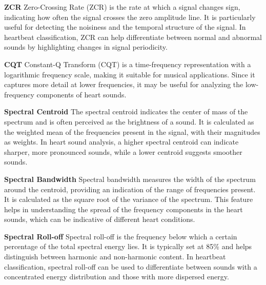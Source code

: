 \vspace{0.5cm}\noindent
\textbf{ZCR}\newline
Zero-Crossing Rate (ZCR) is the rate at which a signal changes sign, indicating how often the signal 
crosses the zero amplitude line. It is particularly useful for detecting the noisiness and the temporal 
structure of the signal. In heartbeat classification, ZCR can help differentiate between normal and abnormal 
sounds by highlighting changes in signal periodicity.

\vspace{0.5cm}\noindent
\textbf{CQT}\newline
Constant-Q Transform (CQT) is a time-frequency representation with a logarithmic frequency scale, making it 
suitable for musical applications. Since it captures more detail at lower frequencies, it may be useful for analyzing 
the low-frequency components of heart sounds.

\vspace{0.5cm}\noindent
\textbf{Spectral Centroid}\newline
The spectral centroid indicates the center of mass of the spectrum and is often perceived as the brightness of a 
sound. It is calculated as the weighted mean of the frequencies present in the signal, with their magnitudes as 
weights. In heart sound analysis, a higher spectral centroid can indicate sharper, more pronounced sounds, 
while a lower centroid suggests smoother sounds. 

\vspace{0.5cm}\noindent
\textbf{Spectral Bandwidth}\newline
Spectral bandwidth measures the width of the spectrum around the centroid, providing an indication of the range 
of frequencies present. It is calculated as the square root of the variance of the spectrum. This feature helps 
in understanding the spread of the frequency components in the heart sounds, which can be indicative of different 
heart conditions.

\vspace{0.5cm}\noindent
\textbf{Spectral Roll-off}
Spectral roll-off is the frequency below which a certain percentage of the total spectral energy lies. It is 
typically set at 85\% and helps distinguish between harmonic and non-harmonic content. In heartbeat classification, 
spectral roll-off can be used to differentiate between sounds with a concentrated energy distribution and those with more dispersed energy.

